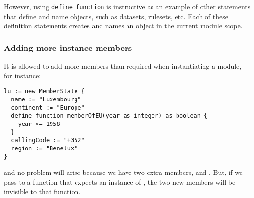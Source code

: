 \documentclass[droidmono,libertine,twoside,user,unofficial]{ecarticle}
\begin{document}
However, using \texttt{define function} is instructive as an example
of other statements that define and name objects, such as datasets,
rulesets, etc.  Each of these definition statements creates and names
an object in the current module scope.





\subsubsection*{Adding more instance members}

It is allowed to add more members than required when instantiating a
module, for instance:
\begin{lstlisting}
lu := new MemberState {
  name := "Luxembourg"
  continent := "Europe"
  define function memberOfEU(year as integer) as boolean {
    year >= 1958
  }
  callingCode := "+352"
  region := "Benelux"
}
\end{lstlisting}
and no problem will arise because we have two extra members,
 and .  But, if we pass  to
a function that expects an instance of , the two
new members will be invisible to that function.
\end{document}
